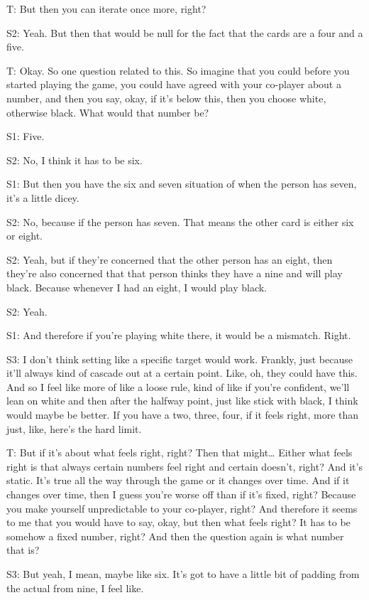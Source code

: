 T: But then you can iterate once more, right? 

S2: Yeah. But then that would be null for the fact that the cards are a four and a five. 

T: Okay. So one question related to this. So imagine that you could before you started playing the game, you could have agreed with your co-player about a number, and then you say, okay, if it's below this, then you choose white, otherwise black. What would that number be? 

S1: Five. 

S2: No, I think it has to be six.

S1: But then you have the six and seven situation of when the person has seven, it's a little dicey.

S2: No, because if the person has seven. That means the other card is either six or eight. 

S2: Yeah, but if they're concerned that the other person has an eight, then they're also concerned that that person thinks they have a nine and will play black. Because whenever I had an eight, I would play black. 

S2: Yeah.

S1: And therefore if you're playing white there, it would be a mismatch. Right. 

S3: I don't think setting like a specific target would work. Frankly, just because it'll always kind of cascade out at a certain point. Like, oh, they could have this. And so I feel like more of like a loose rule, kind of like if you're confident, we'll lean on white and then after the halfway point, just like stick with black, I think would maybe be better. If you have a two, three, four, if it feels right, more than just, like, here's the hard limit. 

T: But if it's about what feels right, right? Then that might… Either what feels right is that always certain numbers feel right and certain doesn’t, right? And it's static. It's true all the way through the game or it changes over time. And if it changes over time, then I guess you're worse off than if it's fixed, right? Because you make yourself unpredictable to your co-player, right? And therefore it seems to me that you would have to say, okay, but then what feels right? It has to be somehow a fixed number, right? And then the question again is what number that is?

S3: But yeah, I mean, maybe like six. It's got to have a little bit of padding from the actual from nine, I feel like. 

